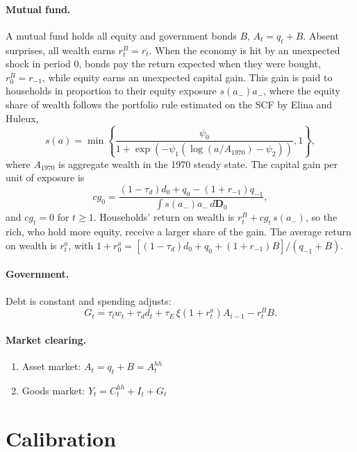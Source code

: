 \documentclass[12pt]{article}
\begin{document}
\paragraph*{Mutual fund.}
A mutual fund holds all equity and government bonds $B$, $A_t=q_t+B$. Absent surprises, all wealth earns $r^B_t=r_t$.
When the economy is hit by an unexpected shock in period 0, bonds pay the return expected when they were bought, $r^B_0=r_{-1}$, while equity earns an unexpected capital gain.
This gain is paid to households in proportion to their equity exposure $s(a_{-})a_{-}$, where the equity share of wealth follows the portfolio rule estimated on the SCF by Elina and Huleux,
$$s(a)=\min\left\{\frac{\psi_0}{1+\exp\left(-\psi_1\left(\log(a/A_{1970})-\psi_2\right)\right)},1\right\},$$
where $A_{1970}$ is aggregate wealth in the 1970 steady state.
The capital gain per unit of exposure is
$$cg_0=\frac{(1-\tau_d)d_0+q_0-(1+r_{-1})q_{-1}}{\int s(a_{-})a_{-}\,d\boldsymbol{D}_0},$$
and $cg_t=0$ for $t\geq1$. Households' return on wealth is $r^B_t+cg_t\,s(a_{-})$, so the rich, who hold more equity, receive a larger share of the gain.
The average return on wealth is $r^a_t$, with $1+r^a_0=\left[(1-\tau_d)d_0+q_0+(1+r_{-1})B\right]/(q_{-1}+B)$.

\paragraph*{Government.}
Debt is constant and spending adjusts:
$$G_t=\tau_l w_t+\tau_d d_t+\tau_E\,\xi(1+r^a_t)A_{t-1}-r^B_t B.$$

\paragraph*{Market clearing.}
\begin{enumerate}
\item Asset market: $A_t=q_t+B=A^{hh}_t$
\item Goods market: $Y_t=C^{hh}_t+I_t+G_t$
\end{enumerate}

\section{Calibration}
\end{document}
